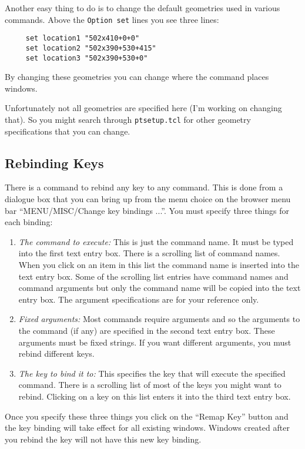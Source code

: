 Another easy thing to do is to change the default geometries
used in various commands.
Above the {\tt Option set} lines you see three lines:
\begin{verbatim}
     set location1 "502x410+0+0"
     set location2 "502x390+530+415"
     set location3 "502x390+530+0"
\end{verbatim}
By changing these geometries you can change where the command
places windows.

Unfortunately not all geometries are specified here
(I'm working on changing that).
So you might search through {\tt ptsetup.tcl} for other
geometry specifications that you can change.



\subsection{ Rebinding Keys }

There is a command to rebind any key to any command.
This is done from a dialogue box that you can bring up
from the menu choice on the browser menu bar
``MENU/MISC/Change key bindings ...''.
You must specify three things for each binding:

\begin{enumerate}
\item {\it The command to execute:} This is just the command name.
It must be typed into the first text entry box.
There is a scrolling list of command names.
When you click on an item in this list the command name is
inserted into the text entry box.
Some of the scrolling list entries have command names and command
arguments but only the command name will be copied into the
text entry box.
The argument specifications are for your reference only.
\item {\it Fixed arguments:}  Most commands require arguments and
so the arguments to the command (if any) are specified in the
second text entry box.
These arguments must be fixed strings.
If you want different arguments, you must rebind different keys.
\item {\it The key to bind it to:}  This specifies the key that
will execute the specified command.
There is a scrolling list of most of the keys you might want
to rebind.
Clicking on a key on this list enters it into the third
text entry box.
\end{enumerate}

Once you specify these three things you click on the ``Remap Key''
button and the key binding will take effect for all existing
windows.
Windows created after you rebind the key will not have this new
key binding.



